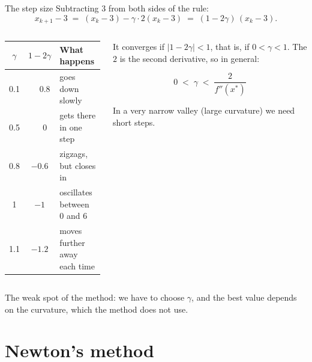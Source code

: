 \documentclass[aspectratio=169,10pt]{beamer}
\begin{document}
\begin{frame}{The step size}
  Subtracting $3$ from both sides of the rule:
  \[
    x_{k+1} - 3 \;=\; (x_k - 3) - \gamma\cdot 2(x_k - 3) \;=\; (1 - 2\gamma)\,(x_k - 3).
  \]
  \begin{columns}[T]
    \begin{column}{0.5\textwidth}
      \centering\small
      \begin{tabular}{ccl}
        \toprule
        $\gamma$ & $1-2\gamma$ & What happens \\
        \midrule
        0.1 & $\phantom{-}0.8$ & goes down slowly \\
        0.5 & $\phantom{-}0$   & gets there in one step \\
        0.8 & $-0.6$ & zigzags, but closes in \\
        1   & $-1$   & oscillates between $0$ and $6$ \\
        1.1 & $-1.2$ & moves further away each time \\
        \bottomrule
      \end{tabular}
    \end{column}
    \begin{column}{0.47\textwidth}
      It converges if $|1-2\gamma|<1$, that is, if $0<\gamma<1$. The $2$ is the second derivative, so in general:
      \begin{ecuacion}
        \[ 0 \;<\; \gamma \;<\; \frac{2}{f''(x^*)} \]
      \end{ecuacion}
      In a very narrow valley (large curvature) we need short steps.
    \end{column}
  \end{columns}
  \medskip

  \alert{The weak spot of the method:} we have to choose $\gamma$, and the best value depends on the curvature, which the method does not use.
\end{frame}

\section{Newton's method}
\end{document}
